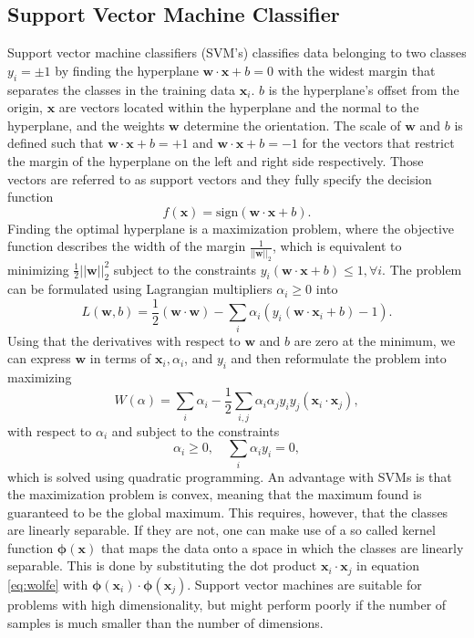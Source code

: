 \subsection{Support Vector Machine Classifier}
Support vector machine classifiers (SVM's) classifies data belonging to two classes $y_i = \pm 1$ by finding the hyperplane $\boldsymbol{w} \cdot \boldsymbol{x} + b = 0$ with the widest margin that separates the classes in the training data $\boldsymbol{x}_i$. $b$ is the hyperplane's offset from the origin, $\boldsymbol{x}$ are vectors located within the hyperplane and the normal to the hyperplane, and the weights $\boldsymbol{w}$ determine the orientation. The scale of $\boldsymbol{w}$ and $b$ is defined such that $\boldsymbol{w} \cdot \boldsymbol{x} + b = +1$ and $\boldsymbol{w} \cdot \boldsymbol{x} + b = -1$ for the vectors that restrict the margin of the hyperplane on the left and right side respectively. Those vectors are referred to as support vectors and they fully specify the decision function
\[
f(\boldsymbol{x}) = \text{sign}(\boldsymbol{w}\cdot \boldsymbol{x} + b).
\]
Finding the optimal hyperplane is a maximization problem, where the objective function describes the width of the margin $\frac{1}{||\boldsymbol{w}||_2}$, which is equivalent to minimizing $\frac{1}{2}||\boldsymbol{w}||_2^2$ subject to the constraints $y_i (\boldsymbol{w}\cdot \boldsymbol{x} + b)\leq 1, \forall i$. The problem can be formulated using Lagrangian multipliers $\alpha_i \geq 0$ into
\[
L(\boldsymbol{w},b) = \frac{1}{2}(\boldsymbol{w} \cdot \boldsymbol{w}) - \sum_i \alpha_i (y_i (\boldsymbol{w} \cdot \boldsymbol{x}_i + b) - 1).
\]
Using that the derivatives with respect to $\boldsymbol{w}$ and $b$ are zero at the minimum, we can express $\boldsymbol{w}$ in terms of $\boldsymbol{x}_i, \alpha_i$, and $y_i$ and then reformulate the problem into maximizing
\begin{equation}
W(\alpha) = \sum_i \alpha_i - \frac{1}{2} \sum_{i,j} \alpha_i \alpha_j y_i y_j (\boldsymbol{x}_i \cdot \boldsymbol{x}_j),
\label{eq:wolfe}
\end{equation}
with respect to $\alpha_i$ and subject to the constraints
\[
\alpha_i \geq 0, \quad \sum_i \alpha_i y_i = 0,
\]
which is solved using quadratic programming. An advantage with SVMs is that the maximization problem is convex, meaning that the maximum found is guaranteed to be the global maximum. This requires, however, that the classes are linearly separable. If they are not, one can make use of a so called kernel function $\boldsymbol{\phi}(\boldsymbol{x})$ that maps the data onto a space in which the classes are linearly separable. This is done by substituting the dot product $\boldsymbol{x}_i \cdot \boldsymbol{x}_j$ in equation \eqref{eq:wolfe} with $\boldsymbol{\phi}(\boldsymbol{x}_i) \cdot \boldsymbol{\phi}(\boldsymbol{x}_j)$. Support vector machines are suitable for problems with high dimensionality, but might perform poorly if the number of samples is much smaller than the number of dimensions. \cite{Campbell11SVM}